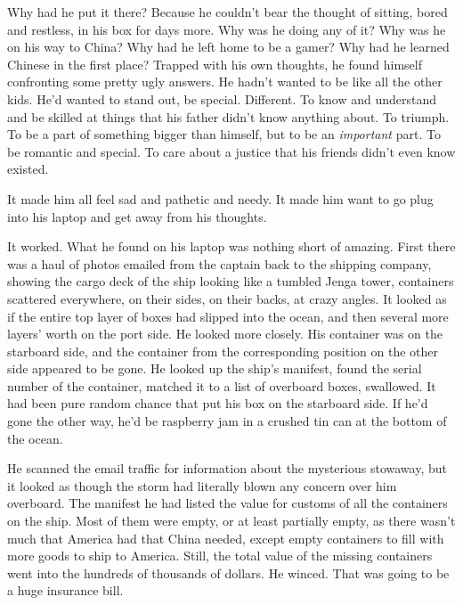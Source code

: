 Why had he put it there? Because he couldn't bear the thought of
sitting, bored and restless, in his box for days more. Why was he
doing any of it? Why was he on his way to China? Why had he left
home to be a gamer? Why had he learned Chinese in the first place?
Trapped with his own thoughts, he found himself confronting some
pretty ugly answers. He hadn't wanted to be like all the other
kids. He'd wanted to stand out, be special. Different. To know and
understand and be skilled at things that his father didn't know
anything about. To triumph. To be a part of something bigger than
himself, but to be an \emph{important} part. To be romantic and
special. To care about a justice that his friends didn't even know
existed.

It made him all feel sad and pathetic and needy. It made him want
to go plug into his laptop and get away from his thoughts.

It worked. What he found on his laptop was nothing short of
amazing. First there was a haul of photos emailed from the captain
back to the shipping company, showing the cargo deck of the ship
looking like a tumbled Jenga tower, containers scattered
everywhere, on their sides, on their backs, at crazy angles. It
looked as if the entire top layer of boxes had slipped into the
ocean, and then several more layers' worth on the port side. He
looked more closely. His container was on the starboard side, and
the container from the corresponding position on the other side
appeared to be gone. He looked up the ship's manifest, found the
serial number of the container, matched it to a list of overboard
boxes, swallowed. It had been pure random chance that put his box
on the starboard side. If he'd gone the other way, he'd be
raspberry jam in a crushed tin can at the bottom of the ocean.

He scanned the email traffic for information about the mysterious
stowaway, but it looked as though the storm had literally blown any
concern over him overboard. The manifest he had listed the value
for customs of all the containers on the ship. Most of them were
empty, or at least partially empty, as there wasn't much that
America had that China needed, except empty containers to fill with
more goods to ship to America. Still, the total value of the
missing containers went into the hundreds of thousands of dollars.
He winced. That was going to be a huge insurance bill.

